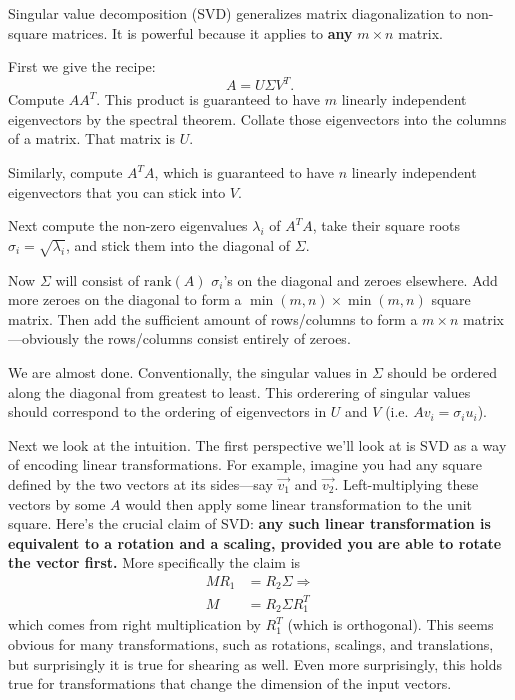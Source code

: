 \documentclass{article}
\begin{document}
Singular value decomposition (SVD) generalizes matrix diagonalization to non-square matrices. 
It is powerful because it applies to \textbf{any} $m \times n$ matrix.

First we give the recipe: 
\begin{equation} 
    A = U \Sigma V^T. \label{eq:SVD} \tag{SVD}
\end{equation}
Compute $AA^T$. This product is guaranteed to have $m$ linearly independent eigenvectors by the 
spectral theorem. Collate those eigenvectors into the columns of a matrix. That matrix is $U$. 

Similarly, compute $A^TA$, which is guaranteed to have $n$ linearly independent eigenvectors 
that you can stick into $V$.

Next compute the non-zero eigenvalues $\lambda_i$ of $A^TA$, take their square roots 
$\sigma_i = \sqrt{\lambda_i}$, and stick them into the diagonal of $\Sigma$. 

Now $\Sigma$ will consist of $\text{rank}(A)$ $\sigma_i$'s on the diagonal and zeroes elsewhere.
Add more zeroes on the diagonal to form a $\min(m, n) \times \min(m, n)$ square matrix. Then add the sufficient
amount of rows/columns to form a $m \times n$ matrix---obviously the rows/columns consist 
entirely of zeroes.

We are almost done. Conventionally, the singular values in $\Sigma$ should be ordered along the diagonal
from greatest to least. This orderering of singular values should correspond to the ordering of 
eigenvectors in $U$ and $V$ (i.e. $Av_i = \sigma_iu_i$).

Next we look at the intuition. The first perspective we'll look at is SVD as a way of encoding linear transformations.
For example, imagine you had any square defined by the two vectors at its sides---say $\vec{v_1}$
and $\vec{v_2}$. Left-multiplying these vectors by some $A$ would then apply some linear transformation
to the unit square. Here's the crucial claim of SVD: \textbf{any such linear transformation is equivalent
to a rotation and a scaling, provided you are able to rotate the vector first.} More specifically the 
claim is 
\begin{align}
MR_1 &= R_2\Sigma \Rightarrow \nonumber \\
M &= R_2 \Sigma R_1^T \nonumber
\end{align}
which comes from right multiplication by $R_1^T$ (which is orthogonal). This seems obvious for many
transformations, such as rotations, scalings, and translations, but surprisingly it
is true for shearing as well. Even more surprisingly, this holds true for transformations that change
the dimension of the input vectors.
\end{document}
